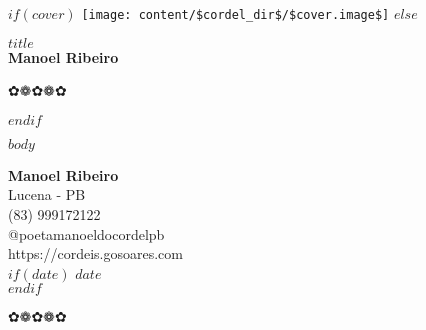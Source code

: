 \documentclass[a6paper,10pt]{book}
\newcommand{\cordelornament}{%
  \begin{center}
    {\Large ✿❁✿❁✿}
  \end{center}
}
\begin{document}
\thispagestyle{empty}
$if(cover)$
  \texttt{[image: content/\$cordel\_dir\$/\$cover.image\$]}
  \clearpage
  \restoregeometry
$else$
  \vspace*{\fill}
  \begin{center}
    {\Huge \textbf{$title$}}\\[1.5cm]
    {\Large \textbf{Manoel Ribeiro}}
    \vspace{1cm}
    \cordelornament
  \end{center}
  \vspace*{\fill}
  \clearpage
$endif$

\pagestyle{cordel}
\setcounter{page}{1}

$body$

\clearpage
\thispagestyle{empty}
\begin{center}
  \LARGE \textbf{Manoel Ribeiro}\\[0.5cm]
  \large Lucena - PB\\
  \large (83) 999172122\\
  \large @poetamanoeldocordelpb\\
  \large https://cordeis.gosoares.com\\
  $if(date)$
  \large $date$\\
  $endif$
  \cordelornament
\end{center}
\end{document}
